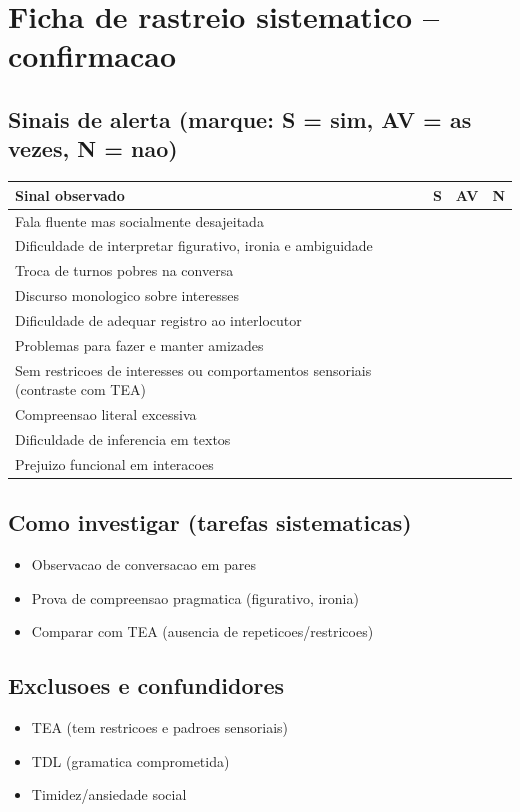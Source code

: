 \documentclass[a4paper,11pt]{book}
\begin{document}
\section*{Ficha de rastreio sistematico -- confirmacao}
\subsection*{Sinais de alerta (marque: S = sim, AV = as vezes, N = nao)}
\begin{tabular}{@{}p{11.5cm}ccc@{}}\toprule
Sinal observado & S & AV & N \\\midrule
Fala fluente mas socialmente desajeitada & & & \\
Dificuldade de interpretar figurativo, ironia e ambiguidade & & & \\
Troca de turnos pobres na conversa & & & \\
Discurso monologico sobre interesses & & & \\
Dificuldade de adequar registro ao interlocutor & & & \\
Problemas para fazer e manter amizades & & & \\
Sem restricoes de interesses ou comportamentos sensoriais (contraste com TEA) & & & \\
Compreensao literal excessiva & & & \\
Dificuldade de inferencia em textos & & & \\
Prejuizo funcional em interacoes & & & \\
\bottomrule\end{tabular}
\subsection*{Como investigar (tarefas sistematicas)}
\begin{itemize}
\item Observacao de conversacao em pares
\item Prova de compreensao pragmatica (figurativo, ironia)
\item Comparar com TEA (ausencia de repeticoes/restricoes)
\end{itemize}
\subsection*{Exclusoes e confundidores}
\begin{itemize}
\item TEA (tem restricoes e padroes sensoriais)
\item TDL (gramatica comprometida)
\item Timidez/ansiedade social
\end{itemize}
\end{document}
